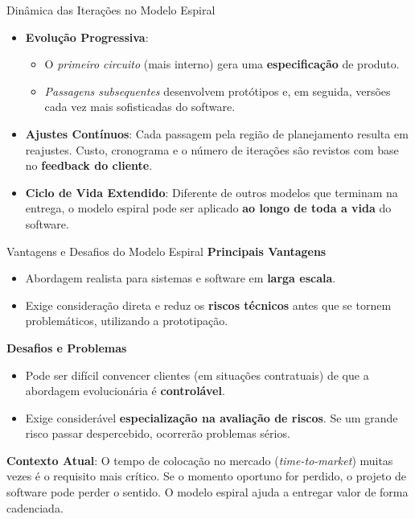 \documentclass[9pt]{beamer}
\begin{document}
\begin{frame}{Dinâmica das Iterações no Modelo Espiral}
  \begin{itemize}
    \item \textbf{Evolução Progressiva}: 
    \begin{itemize}
      \item O \textit{primeiro circuito} (mais interno) gera uma \textbf{especificação} de produto.
      \item \textit{Passagens subsequentes} desenvolvem protótipos e, em seguida, versões cada vez mais sofisticadas do software.
    \end{itemize}
    \vspace{0.2cm}
    \item \textbf{Ajustes Contínuos}: Cada passagem pela região de planejamento resulta em reajustes. Custo, cronograma e o número de iterações são revistos com base no \textbf{feedback do cliente}.
    \vspace{0.2cm}
    \item \textbf{Ciclo de Vida Extendido}: Diferente de outros modelos que terminam na entrega, o modelo espiral pode ser aplicado \textbf{ao longo de toda a vida} do software.
  \end{itemize}
\end{frame}

\begin{frame}{Vantagens e Desafios do Modelo Espiral}
  \textbf{Principais Vantagens}
  \begin{itemize}
    \item Abordagem realista para sistemas e software em \textbf{larga escala}.
    \item Exige consideração direta e reduz os \textbf{riscos técnicos} antes que se tornem problemáticos, utilizando a prototipação.
  \end{itemize}
  
  \vspace{0.3cm}
  \textbf{Desafios e Problemas}
  \begin{itemize}
    \item Pode ser difícil convencer clientes (em situações contratuais) de que a abordagem evolucionária é \textbf{controlável}.
    \item Exige considerável \textbf{especialização na avaliação de riscos}. Se um grande risco passar despercebido, ocorrerão problemas sérios.
  \end{itemize}

  \vspace{0.3cm}
  \centering
  \colorbox{yellow!15}{
    \parbox{0.92\textwidth}{
      \scriptsize
      \textbf{Contexto Atual}: O tempo de colocação no mercado (\textit{time-to-market}) muitas vezes é o requisito mais crítico. Se o momento oportuno for perdido, o projeto de software pode perder o sentido. O modelo espiral ajuda a entregar valor de forma cadenciada.
    }
  }
\end{frame}
\end{document}
